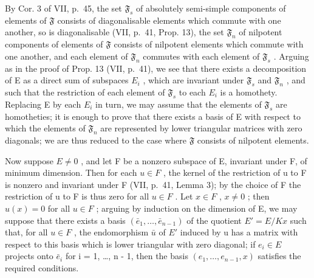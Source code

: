 By Cor. 3 of VII, p.~45, the set \(\mathfrak{F}_s\) of absolutely semi-simple components of elements of \(\mathfrak{F}\) consists of diagonalisable elements which commute with one another, so is diagonalisable (VII, p.~41, Prop. 13), the set \(\mathfrak{F}_n\) of nilpotent components of elements of \(\mathfrak{F}\) consists of nilpotent elements which commute with one another, and each element of \(\mathfrak{F}_n\) commutes with each element of \(\mathfrak{F}_s\) . Arguing as in the proof of Prop. 13 (VII, p.~41), we see that there exists a decomposition of E as a direct sum of subspaces \(E_i\) , which are invariant under \(\mathfrak{F}_s\) and \(\mathfrak{F}_n\) , and such that the restriction of each element of \(\mathfrak{F}_s\) to each \(E_i\) is a homothety. Replacing E by each \(E_i\) in turn, we may assume that the elements of \(\mathfrak{F}_s\) are homotheties; it is enough to prove that there exists a basis of E with respect to which the elements of \(\mathfrak{F}_n\) are represented by lower triangular matrices with zero diagonals; we are thus reduced to the case where \(\mathfrak{F}\) consists of nilpotent elements.

Now suppose \(E \neq 0\) , and let F be a nonzero subspace of E, invariant under F, of minimum dimension. Then for each \(u \in F\) , the kernel of the restriction of u to F is nonzero and invariant under F (VII, p.~41, Lemma 3); by the choice of F the restriction of u to F is thus zero for all \(u \in F\) . Let \(x \in F\) , \(x \neq 0\) ; then \(u(x) = 0\) for all \(u \in F\) ; arguing by induction on the dimension of E, we may suppose that there exists a basis \((\bar{e}_{1}, \ldots, \bar{e}_{n-1})\) of the quotient \(E' = E/Kx\) such that, for all \(u \in F\) , the endomorphism \(\bar{u}\) of \(E'\) induced by u has a matrix with respect to this basis which is lower triangular with zero diagonal; if \(e_{i} \in E\) projects onto \(\bar{e}_{i}\) for i = 1, \ldots, n - 1, then the basis \((e_{1}, \ldots, e_{n-1}, x)\) satisfies the required conditions.

\BourbakiExercises

\BourbakiExerciseGroup


